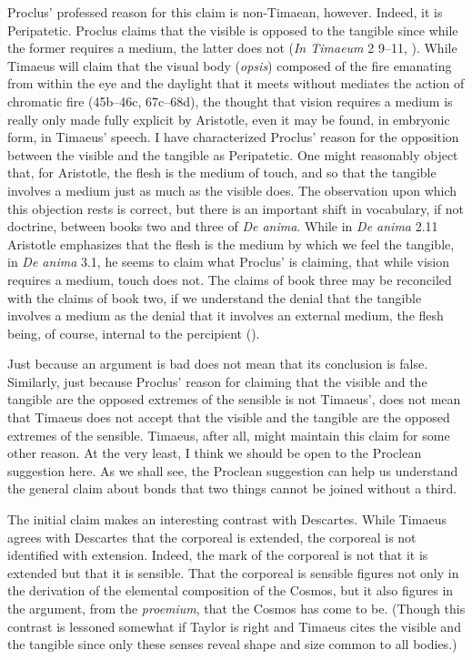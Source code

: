 Proclus' professed reason for this claim is non-Timaean, however. Indeed, it is Peripatetic. Proclus claims that the visible is opposed to the tangible since while the former requires a medium, the latter does not (\emph{In Timaeum} 2 9--11, \citealt{Diehl:1903re}). While Timaeus will claim that the visual body (\emph{opsis}) composed of the fire emanating from within the eye and the daylight that it meets without mediates the action of chromatic fire (45b--46c, 67c--68d), the thought that vision requires a medium is really only made fully explicit by Aristotle, even it may be found, in embryonic form, in Timaeus' speech. I have characterized Proclus' reason for the opposition between the visible and the tangible as Peripatetic. One might reasonably object that, for Aristotle, the flesh is the medium of touch, and so that the tangible involves a medium just as much as the visible does. The observation upon which this objection rests is correct, but there is an important shift in vocabulary, if not doctrine, between books two and three of \emph{De anima}. While in \emph{De anima} 2.11 Aristotle emphasizes that the flesh is the medium by which we feel the tangible, in \emph{De anima} 3.1, he seems to claim what Proclus' is claiming, that while vision requires a medium, touch does not. The claims of book three may be reconciled with the claims of book two, if we understand the denial that the tangible involves a medium as the denial that it involves an external medium, the flesh being, of course, internal to the percipient (\citealt[chapter 2.1.3]{Kalderon:2015fr}). 

Just because an argument is bad does not mean that its conclusion is false. Similarly, just because Proclus' reason for claiming that the visible and the tangible are the opposed extremes of the sensible is not Timaeus', does not mean that Timaeus does not accept that the visible and the tangible are the opposed extremes of the sensible. Timaeus, after all, might maintain this claim for some other reason. At the very least, I think we should be open to the Proclean suggestion here. As we shall see, the Proclean suggestion can help us understand the general claim about bonds that two things cannot be joined without a third.

The initial claim makes an interesting contrast with Descartes. While Timaeus agrees with Descartes that the corporeal is extended, the corporeal is not identified with extension. Indeed, the mark of the corporeal is not that it is extended but that it is sensible. That the corporeal is sensible figures not only in the derivation of the elemental composition of the Cosmos, but it also figures in the argument, from the \emph{proemium}, that the Cosmos has come to be. (Though this contrast is lessoned somewhat if Taylor is right and Timaeus cites the visible and the tangible since only these senses reveal shape and size common to all bodies.)

